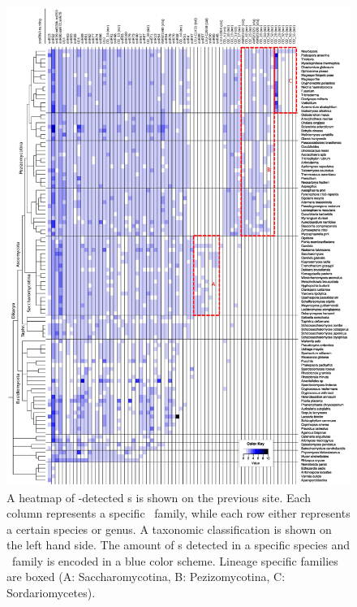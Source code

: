 \begin{figure}
  \centering
  \includegraphics[width=1.05\textwidth]{pics/CD_snoRNAs_collapsed.short_naming.eps}
  \caption{A heatmap of
    \snostrip-detected \cd s is shown on the previous site. Each column represents a specific \sno\
    family, while each row either represents a certain species or
    genus. A taxonomic classification is shown on the left hand side. The amount of
    \sno s detected in a specific species and \sno\ family is encoded in a
    blue color scheme. Lineage specific families are boxed (A:
    Saccharomycotina, B: Pezizomycotina, C: Sordariomycetes). %
  }
  \label{fig:heatmap_CD_snoRNAs} 
\end{figure}




